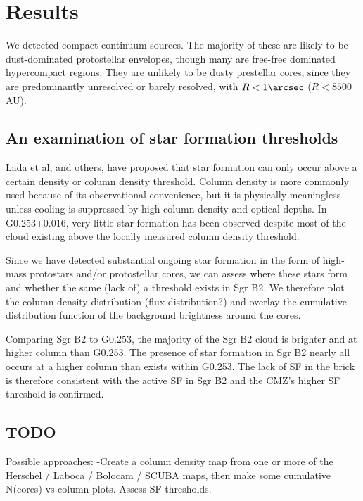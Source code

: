 \section{Results}
We detected \ncores compact continuum sources.  The majority of these are
likely to be dust-dominated protostellar envelopes, though many are free-free
dominated hypercompact \hii regions.  They are unlikely to be dusty prestellar
cores, since they are predominantly unresolved or barely resolved, with
$R<1\arcsec$ ($R<8500$ AU).

\subsection{An examination of star formation thresholds}
Lada et al, and others, have proposed that star formation can only occur above
a certain density or column density threshold.  Column density is more commonly
used because of its observational convenience, but it is physically meaningless
unless cooling is suppressed by high column density and optical depths.  In
G0.253+0.016, very little star formation has been observed
\citep{Longmore2013a,Johnston2014a,Rathborne2015a} despite most of the cloud
existing above the locally measured column density threshold.

Since we have detected substantial ongoing star formation in the form of
high-mass protostars and/or protostellar cores, we can assess where these stars
form and whether the same (lack of) a threshold exists in Sgr B2.  We therefore
plot the column density distribution (flux distribution?) and overlay the
cumulative distribution function of the background brightness around the cores.

Comparing Sgr B2 to G0.253, the majority of the Sgr B2 cloud is brighter and at
higher column than G0.253.  The presence of star formation in Sgr B2 nearly all
occurs at a higher column than exists within G0.253.  The lack of SF in the brick
is therefore consistent with the active SF in Sgr B2 and the CMZ's higher SF threshold
is confirmed.

\subsection{TODO}
Possible approaches:
-Create a column density map from one or more of the Herschel / Laboca / Bolocam / SCUBA maps,
then make some cumulative N(cores) vs column plots.  Assess SF thresholds.


